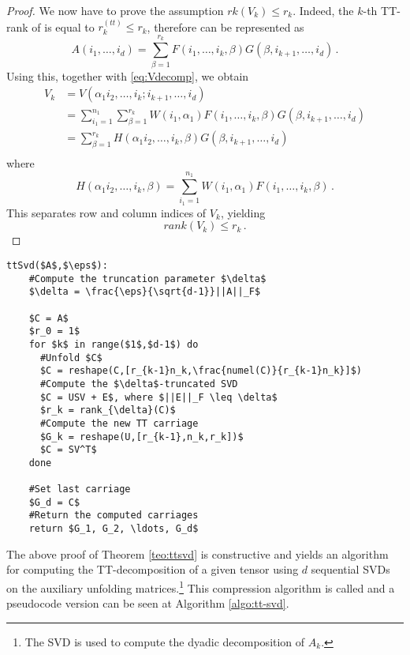 \begin{Teo}
\begin{proof}
    We now have to prove the assumption $rk(V_k) \leq r_k$. Indeed, the $k$-th TT-rank of \A is equal to $r^{(tt)}_k \leq r_k$, therefore \A can be represented as
    \begin{equation*}
      A(i_1,\ldots,i_d) = \sum_{\beta=1}^{r_k} F(i_1,\ldots,i_k,\beta) G(\beta,i_{k+1},\ldots,i_d)\, .
    \end{equation*}
    Using this, together with \eqref{eq:Vdecomp}, we obtain
    \begin{align*}
      V_k &= V(\alpha_1 i_2,\ldots,i_k;i_{k+1},\ldots,i_d) \\
      &= \sum_{i_1 = 1}^{n_1} \sum_{\beta = 1}^{r_k} W(i_1, \alpha_1) F(i_1,\ldots,i_k,\beta) G(\beta,i_{k+1},\ldots,i_d) \\
      &= \sum_{\beta = 1}^{r_k} H(\alpha_1 i_2,\ldots,i_k,\beta) G(\beta,i_{k+1},\ldots,i_d) \\
    \end{align*}
    where
    \begin{equation*}
      H(\alpha_1 i_2,\ldots,i_k,\beta) = \sum_{i_1 = 1}^{n_1} W(i_1, \alpha_1) F(i_1,\ldots,i_k,\beta)\, .
    \end{equation*}
    This separates row and column indices of $V_k$, yielding
    \begin{equation*}
      rank(V_k) \leq r_k\, .
    \end{equation*}
  \end{proof}
  
\end{Teo}

\begin{lstlisting}[float, caption=TT-SVD compression algorithm, label=algo:tt-svd, title=TT-SVD compression algorithm]
  ttSvd($A$,$\eps$):
    #Compute the truncation parameter $\delta$
    $\delta = \frac{\eps}{\sqrt{d-1}}||A||_F$
  
    $C = A$
    $r_0 = 1$
    for $k$ in range($1$,$d-1$) do
      #Unfold $C$
      $C = reshape(C,[r_{k-1}n_k,\frac{numel(C)}{r_{k-1}n_k}]$)
      #Compute the $\delta$-truncated SVD
      $C = USV + E$, where $||E||_F \leq \delta$
      $r_k = rank_{\delta}(C)$
      #Compute the new TT carriage
      $G_k = reshape(U,[r_{k-1},n_k,r_k])$
      $C = SV^T$
    done
    
    #Set last carriage
    $G_d = C$
    #Return the computed carriages
    return $G_1, G_2, \ldots, G_d$
\end{lstlisting}

The above proof of Theorem \ref{teo:ttsvd} is constructive and yields an algorithm for computing the TT-decomposition of a given tensor using $d$ sequential SVDs on the auxiliary unfolding matrices.\footnote{The SVD is used to compute the dyadic decomposition of $A_k$.} This  compression algorithm is called  and a pseudocode version can be seen at Algorithm \ref{algo:tt-svd}.

